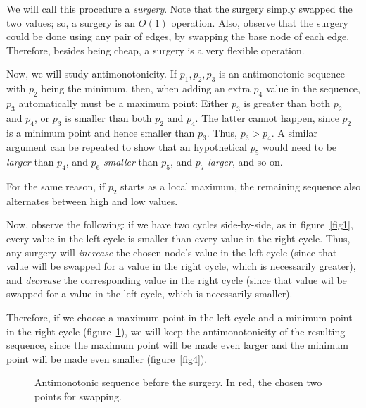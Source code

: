 \documentclass{article}
\begin{document}
We will call this procedure a \emph{surgery}.
Note that the surgery simply swapped the two values;
so, a surgery is an $O(1)$ operation.
Also, observe that the surgery could be done using
any pair of edges,
by swapping the base node of each edge.
Therefore, besides being cheap,
a surgery is a very flexible operation.

Now, we will study antimonotonicity.
If $p_1, p_2, p_3$ is an antimonotonic sequence
with $p_2$ being the minimum,
then, when adding an extra $p_4$ value in the sequence,
$p_3$ automatically must be a maximum point:
Either $p_3$ is greater than both $p_2$ and $p_4$,
or $p_3$ is smaller than both $p_2$ and $p_4$.
The latter cannot happen,
since $p_2$ is a minimum point and hence smaller than $p_3$.
Thus, $p_3 > p_4$.
A similar argument can be repeated to show that
an hypothetical $p_5$ would need to be \emph{larger} than $p_4$,
and $p_6$ \emph{smaller} than $p_5$,
and $p_7$ \emph{larger}, and so on.

For the same reason, if $p_2$ starts as a local maximum,
the remaining sequence also alternates between high and low values.

Now, observe the following:
if we have two cycles side-by-side,
as in figure~\ref{fig1},
every value in the left cycle is smaller than every value in the right cycle.
Thus, any surgery will \emph{increase} the chosen node's value in the left cycle
(since that value will be swapped for a value in the right cycle,
which is necessarily greater),
and \emph{decrease} the corresponding value in the right cycle
(since that value wil be swapped for a value in the left cycle,
which is necessarily smaller).

Therefore, if we choose a maximum point in the left cycle
and a minimum point in the right cycle (figure~\ref{fig3}),
we will keep the antimonotonicity of the resulting sequence,
since the maximum point will be made even larger
and the minimum point will be made even smaller (figure~\ref{fig4}).

\begin{figure}[h]
    \centering
    \caption[Antimonotonic sequence before the surgery]{
        Antimonotonic sequence before the surgery.
        In red, the chosen two points for swapping.
    }
    \label{fig3}
\end{figure}
\end{document}
